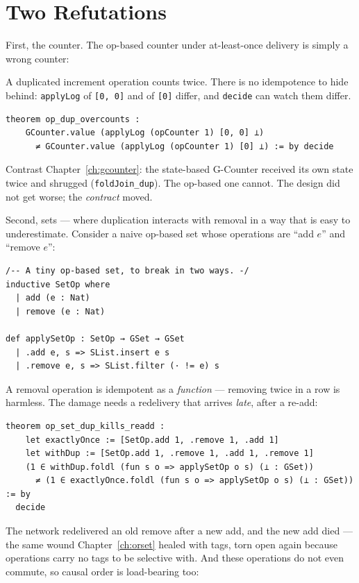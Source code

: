 \documentclass[12pt, a4paper, openright]{book}
\theoremstyle{thmstyle}
\theoremstyle{defstyle}
\newcommand{\lc}[1]{\texttt{#1}}
\newcounter{refutation}[chapter]
\renewcommand{\therefutation}{\thechapter.\arabic{refutation}}
\newenvironment{refutedbox}[1]{%
  \refstepcounter{refutation}%
  \begin{tcolorbox}[refutedbox,
    title={Refuted \therefutation\ --- #1}]%
}{\end{tcolorbox}}
\begin{document}
\section{Two Refutations}

First, the counter. The op-based counter under at-least-once delivery is
simply a wrong counter:

\begin{refutedbox}{The op-based counter tolerates duplicated delivery}
\label{ref:op-dup}
  A duplicated increment operation counts twice. There is no idempotence
  to hide behind: \lc{applyLog} of \lc{[0, 0]} and of \lc{[0]} differ,
  and \lc{decide} can watch them differ.
\begin{verbatim}
theorem op_dup_overcounts :
    GCounter.value (applyLog (opCounter 1) [0, 0] ⊥)
      ≠ GCounter.value (applyLog (opCounter 1) [0] ⊥) := by decide
\end{verbatim}
  Contrast Chapter~\ref{ch:gcounter}: the state-based G-Counter received
  its own state twice and shrugged (\lc{foldJoin_dup}). The op-based one
  cannot. The design did not get worse; the \emph{contract} moved.
\end{refutedbox}

Second, sets --- where duplication interacts with removal in a way that
is easy to underestimate. Consider a naive op-based set whose operations
are ``add $e$'' and ``remove $e$'':

\begin{verbatim}
/-- A tiny op-based set, to break in two ways. -/
inductive SetOp where
  | add (e : Nat)
  | remove (e : Nat)

def applySetOp : SetOp → GSet → GSet
  | .add e, s => SList.insert e s
  | .remove e, s => SList.filter (· != e) s
\end{verbatim}

A removal operation is idempotent as a \emph{function} --- removing
twice in a row is harmless. The damage needs a redelivery that arrives
\emph{late}, after a re-add:

\begin{verbatim}
theorem op_set_dup_kills_readd :
    let exactlyOnce := [SetOp.add 1, .remove 1, .add 1]
    let withDup := [SetOp.add 1, .remove 1, .add 1, .remove 1]
    (1 ∈ withDup.foldl (fun s o => applySetOp o s) (⊥ : GSet))
      ≠ (1 ∈ exactlyOnce.foldl (fun s o => applySetOp o s) (⊥ : GSet)) := by
  decide
\end{verbatim}

The network redelivered an old remove after a new add, and the new add
died --- the same wound Chapter~\ref{ch:orset} healed with tags, torn
open again because operations carry no tags to be selective with. And
these operations do not even commute, so causal order is load-bearing
too:
\end{document}
